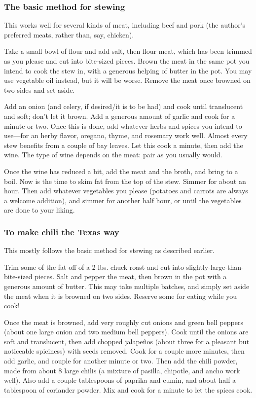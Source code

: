 \documentclass[10pt]{article}
\begin{document}
\subsubsection*{The basic method for stewing}

This works well for several kinds of meat, including beef and pork (the author's preferred meats, rather than, say, chicken).

Take a small bowl of flour and add salt, then flour meat, which has been trimmed as you please and cut into bite-sized pieces.
Brown the meat in the same pot you intend to cook the stew in, with a generous helping of butter in the pot.
You may use vegetable oil instead, but it will be worse.
Remove the meat once browned on two sides and set aside.

Add an onion (and celery, if desired/it is to be had) and cook until translucent and soft; don't let it brown.
Add a generous amount of garlic and cook for a minute or two.
Once this is done, add whatever herbs and spices you intend to use---for an herby flavor, oregano, thyme, and rosemary work well.
Almost every stew benefits from a couple of bay leaves.
Let this cook a minute, then add the wine.
The type of wine depends on the meat: pair as you usually would.

Once the wine has reduced a bit, add the meat and the broth, and bring to a boil.
Now is the time to skim fat from the top of the stew.
Simmer for about an hour.
Then add whatever vegetables you please (potatoes and carrots are always a welcome addition), and simmer for another half hour, or until the vegetables are done to your liking.

\subsubsection*{To make chili the Texas way}

This mostly follows the basic method for stewing as described earlier.

Trim some of the fat off of a 2 lbs. chuck roast and cut into slightly-large-than-bite-sized pieces.
Salt and pepper the meat, then brown in the pot with a generous amount of butter.
This may take multiple batches, and simply set aside the meat when it is browned on two sides.
Reserve some for eating while you cook!

Once the meat is browned, add very roughly cut onions and green bell peppers (about one large onion and two medium bell peppers).
Cook until the onions are soft and translucent, then add chopped jalape\~{n}os (about three for a pleasant but noticeable spiciness) with seeds removed.
Cook for a couple more minutes, then add garlic, and couple for another minute or two.
Then add the chili powder, made from about 8 large chilis (a mixture of pasilla, chipotle, and ancho work well).
Also add a couple tablespoons of paprika and cumin, and about half a tablespoon of coriander powder.
Mix and cook for a minute to let the spices cook.
\end{document}
